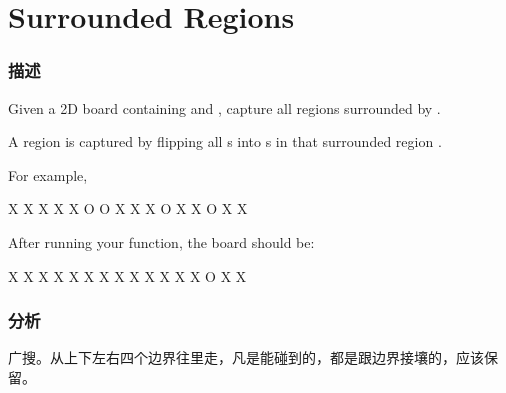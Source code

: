 \section{Surrounded Regions} %
\label{sec:surrounded-regions}


\subsubsection{描述}
Given a 2D board containing  and , capture all regions surrounded by .

A region is captured by flipping all s into s in that surrounded region .

For example,
\begin{Code}
X X X X
X O O X
X X O X
X O X X
\end{Code}

After running your function, the board should be:
\begin{Code}
X X X X
X X X X
X X X X
X O X X
\end{Code}


\subsubsection{分析}
广搜。从上下左右四个边界往里走，凡是能碰到的，都是跟边界接壤的，应该保留。


